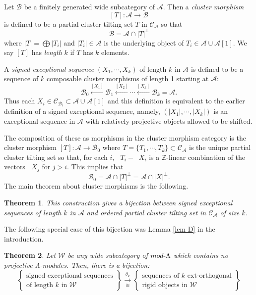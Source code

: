\documentclass[11pt]{amsart}
\newtheorem{thm}{Theorem}[section]
\theoremstyle{definition}
\theoremstyle{remark}
\numberwithin{equation}{section}
\DeclareMathOperator{\undim}{\underline{dim}}
\newcommand{\cA}{\ensuremath{{\mathcal{A}}}}
\newcommand{\cB}{\ensuremath{{\mathcal{B}}}}
\newcommand{\cC}{\ensuremath{{\mathcal{C}}}}
\newcommand{\cW}{\ensuremath{{\mathcal{W}}}}
\begin{document}
Let $\cB$ be a finitely generated wide subcategory of $\cA$. Then a \emph{cluster morphism} 
\[
[T]:\cA\to \cB
\]
 is defined to be a partial cluster tilting set $T$ in $\cC_\cA$ so that 
\[
	\cB=\cA\cap |T|^\perp
\]
where $|T|=\bigoplus |T_i|$ and $|T_i|\in\cA$ is the underlying object of $T_i\in \cA\cup \cA[1]$. We say $[T]$ has \emph{length} $k$ if $T$ has $k$ elements.
 
A \emph{signed exceptional sequence} $(X_1,\cdots,X_k)$ of length $k$ in $\cA$ is defined to be a sequence of $k$ composable cluster morphisms of length 1 starting at $\cA$:
\[
	\cB_0\xleftarrow{[X_1]} \cB_1\xleftarrow{[X_2]} \cdots \xleftarrow{[X_k]}  \cB_k=\cA.
\]Thus each $X_i\in\cC_{\cB_i}\subset \cA\cup \cA[1]$ and this definition is equivalent to the earlier definition of a signed exceptional sequence, namely, $(|X_1|,\cdots,|X_k|)$ is an exceptional sequence in $\cA$ with relatively projective objects allowed to be shifted.

The composition of these as morphisms in the cluster morphism category is the cluster morphism $[T]:\cA\to \cB_0$ where $T=\{T_1,\cdots,T_k\}\subset \cC_\cA$ is the unique partial cluster tilting set so that, for each $i$, $\undim T_i-\undim X_i$ is a $\mathbb Z$-linear combination of the vectors $\undim X_j$ for $j>i$. This implies that
\[
	\cB_0=\cA\cap |T|^\perp=\cA\cap |X|^\perp.
\]
The main theorem about cluster morphisms is the following.

\begin{thm}\cite{IT13}\label{thm: cluster morphism bijection}
This construction gives a bijection between signed exceptional sequences of length $k$ in $\cA$ and ordered partial cluster tilting set in $\cC_\cA$ of size $k$.
\end{thm}

The following special case of this bijection was Lemma \ref{lem D} in the introduction.

\begin{thm}\label{thm: Lemma E}
Let $\cW$ be any wide subcategory of $mod\text-\Lambda$ which contains no projective $\Lambda$-modules. Then, there is a bijection:
\[
	\left\{
	\begin{matrix}\text{signed exceptional sequences}\\
	\text{of length $k$ in $\cW$}
	\end{matrix}
	\right\}
	\xrightarrow[\cong]{\theta_k}
	\left\{
	\begin{matrix}\text{sequences of $k$ ext-orthogonal}\\
	\text{rigid objects in $\cW$}
	\end{matrix}
	\right\}
\]
\end{thm}
\end{document}
